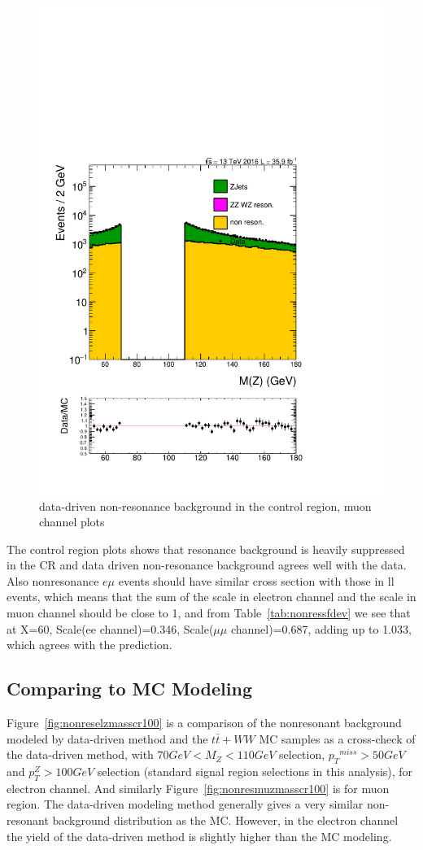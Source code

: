 \begin{figure}[htbp]
\begin{center}
\includegraphics[width=0.39\linewidth, page=4]{figures/test_metzpt50_RhoWt_puWeight68075_metfilter_mu_.pdf}
\caption{data-driven non-resonance background in the control region, muon channel plots}
\label{fig:nonresmucr}
\end{center}
\end{figure}

\vspace{0.3cm}
The control region plots shows that resonance background is heavily suppressed in the CR and data driven non-resonance background agrees well with the data. Also nonresonance $e\mu$ events should have similar cross section with those in ll events, which means that the sum of the scale in electron channel and the scale in muon channel should be close to 1, and from Table~\ref{tab:nonressfdev} we see that at X=60, Scale(ee channel)=0.346, Scale($\mu\mu$ channel)=0.687, adding up to 1.033, which agrees with the prediction.

\subsection{Comparing to MC Modeling}
Figure~\ref{fig:nonreselzmasscr100} is a comparison of the nonresonant background modeled by data-driven method and the $t\bar{t}+WW$ MC samples as a cross-check of the data-driven method, with $70GeV<M_{Z}<110GeV$ selection, ${p_{T}}^{miss}>50GeV$ and $p_{T}^{Z}>100GeV$ selection (standard signal region selections in this analysis), for electron channel. And similarly Figure~\ref{fig:nonresmuzmasscr100} is for muon region. The data-driven modeling method generally gives a very similar non-resonant background distribution as the MC. However, in the electron channel the yield of the data-driven method is slightly higher than the MC modeling.

